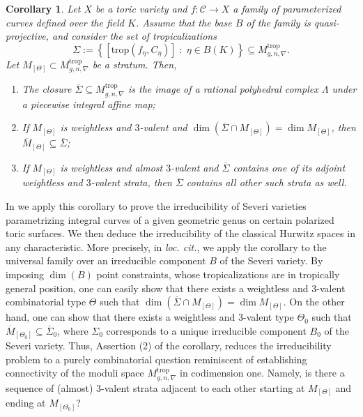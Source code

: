 \documentclass[11pt,reqno]{amsart}
\numberwithin{equation}{section}
\newtheorem*{Cor}{Corollary}
\theoremstyle{definition}
\newcommand{\trop}{\mathrm{trop}}
\newcommand{\cC}{{\mathcal{C}}}
\theoremstyle{remark}
\begin{document}
\begin{Cor}
    Let $X$ be a toric variety and $f\colon \cC \rightarrow X$ a family of parameterized curves defined over the field $K$. Assume that the base $B$ of the family is quasi-projective, and consider the set of tropicalizations
    $$\Sigma:=\left\{\left[ \trop(f_\eta, C_\eta)\right]\; :\; \eta\in B(K) \right\}\subseteq M^{\trop}_{g,n,\nabla}.$$
    Let $M_{[\Theta]}\subset M^{\trop}_{g,n,\nabla}$ be a stratum. Then,
    \begin{enumerate}
        \item The closure $\overline\Sigma\subseteq M^{\trop}_{g,n,\nabla}$ is the image of a rational polyhedral complex $\Lambda$ under a piecewise integral affine map;
        \item If $M_{[\Theta]}$ is weightless and $3$-valent and $\dim(\overline{\Sigma}\cap M_{[\Theta]})=\dim M_{[\Theta]}$, then $\overline M_{[\Theta]}\subseteq \overline{\Sigma}$;
        \item If $M_{[\Theta]}$ is weightless and almost $3$-valent and $\overline{\Sigma}$ contains one of its adjoint weightless and $3$-valent strata, then $\overline{\Sigma}$ contains all other such strata as well. 
    \end{enumerate}
\end{Cor}

In \cite{CHT24b} we apply this corollary to prove the irreducibility of Severi varieties parametrizing integral curves of a given geometric genus on certain polarized toric surfaces. We then deduce the irreducibility of the classical Hurwitz spaces in any characteristic. More precisely, in \emph{loc. cit.}, we apply the corollary to the universal family over an irreducible component $B$ of the Severi variety. By imposing $\dim(B)$ point constraints, whose tropicalizations are in tropically general position, one can easily show that there exists a weightless and $3$-valent combinatorial type $\Theta$ such that $\dim(\overline{\Sigma}\cap M_{[\Theta]})=\dim M_{[\Theta]}$. On the other hand, one can show that there exists a weightless and $3$-valent type $\Theta_0$ such that $\overline M_{[\Theta_0]}\subseteq \overline{\Sigma}_0$, where $\Sigma_0$ corresponds to a unique irreducible component $B_0$ of the Severi variety. Thus, Assertion (2) of the corollary, reduces the irreducibility problem to a purely combinatorial question reminiscent of establishing connectivity of the moduli space $M^{\trop}_{g,n,\nabla}$ in codimension one. Namely, is there a sequence of (almost) $3$-valent strata adjacent to each other starting at $M_{[\Theta]}$ and ending at $M_{[\Theta_0]}$?  
\end{document}
